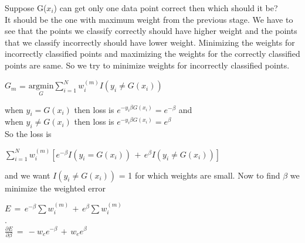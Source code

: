\documentclass[twoside]{article}
\begin{document}
Suppose G($x_{i}$) can get only one data point correct then which should it be? \\
It should be the one with maximum weight from the previous stage. We have to see that the points  we classify correctly should have higher weight and the points that we classify incorrectly should have lower weight. Minimizing the weights for incorrectly classified points and maximizing the weights for the correctly classified points are same. So we try to minimize weights for incorrectly classified points.
\begin{center}
$G_{m}$ = $\underset{G}{\text{argmin}} \sum\limits_{i=1}^N w_{i}^{(m)} I(y_{i} \neq G(x_{i}))$
\end{center}
when $y_{i} = G(x_{i})$ then loss is $e^{-y_{i}\beta G(x_{i})} = e^{-\beta}$ and\\
when $y_{i} \neq G(x_{i})$ then loss is $e^{-y_{i}\beta G(x_{i})} = e^{\beta}$\\
So the loss is 
\begin{center}
$\sum\limits_{i=1}^N w_{i}^{(m)}[e^{-\beta} I(y_{i} = G(x_{i}))\, +\, e^{\beta} I(y_{i} \neq G(x_{i}))]$ 
\end{center}
and we want $I(y_{i} \neq G(x_{i}))$ = 1 for which weights are small. Now to find $\beta$ we minimize the weighted error
\begin{center}
$E \, = \,e^{-\beta}\sum w_{i}^{(m)}\, + \, e^{\beta}\sum w_{i}^{(m)}$\\.\\
$\frac{\partial{E}}{\partial{\beta}} \, = \, -w_{c}e^{-\beta} \, + \, w_{e}e^{\beta}$
\end{center}
\end{document}

